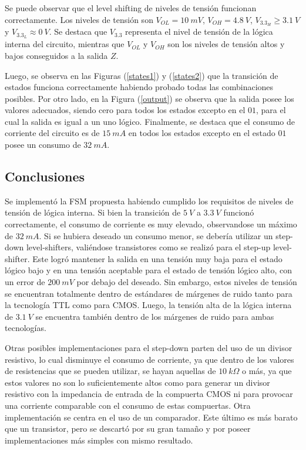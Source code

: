 Se puede observar que el level shifting de niveles de tensión funcionan correctamente. Los niveles de tensión son $V_{OL} = 10 \ mV$, $V_{OH} = 4.8 \ V$, $V_{3.3_{H}} \geq 3.1 \ V$ y $V_{3.3_{L}} \approx 0 \ V$. Se destaca que $V_{3.3}$ representa el nivel de tensión de la lógica interna del circuito, mientras que $V_{OL}$ y $V_{OH}$ son los niveles de tensión altos y bajos conseguidos a la salida $Z$.

Luego, se observa en las Figuras (\ref{states1}) y (\ref{states2}) que la transición de estados funciona correctamente habiendo probado todas las combinaciones posibles. Por otro lado, en la Figura (\ref{output}) se observa que la salida posee los valores adecuados, siendo cero para todos los estados excepto en el $01$, para el cual la salida es igual a un uno lógico. Finalmente, se destaca que el consumo de corriente del circuito es de $15 \ mA$ en todos los estados excepto en el estado $01$ posee un consumo de $32 \ mA$.

\subsection{Conclusiones}

Se implementó la FSM propuesta habiendo cumplido los requisitos de niveles de tensión de lógica interna. Si bien la transición de $5 \ V$ a $3.3 \ V$ funcionó correctamente, el consumo de corriente es muy elevado, observandose un máximo de $32 \ mA$. Si se hubiera deseado un consumo menor, se debería utilizar un step-down level-shifters, valiéndose transistores como se realizó para el step-up level-shifter. Este logró mantener la salida en una tensión muy baja para el estado lógico bajo y en una tensión aceptable para el estado de tensión lógico alto, con un error de $200 \ mV$ por debajo del deseado. Sin embargo, estos niveles de tensión se encuentran totalmente dentro de estándares de márgenes de ruido tanto para la tecnología TTL como para CMOS. Luego, la tensión alta de la lógica interna de $3.1 \ V$ se encuentra también dentro de los márgenes de ruido para ambas tecnologías.

Otras posibles implementaciones para el step-down parten del uso de un divisor resistivo, lo cual disminuye el consumo de corriente, ya que dentro de los valores de resistencias que se pueden utilizar, se hayan aquellas de $10 \ k\Omega$ o más, ya que estos valores no son lo suficientemente altos como para generar un divisor resistivo con la impedancia de entrada de la compuerta CMOS ni para provocar una corriente comparable con el consumo de estas compuertas. Otra implementación se centra en el uso de un comparador. Este último es más barato que un transistor, pero se descartó por su gran tamaño y por poseer implementaciones más simples con mismo resultado.

